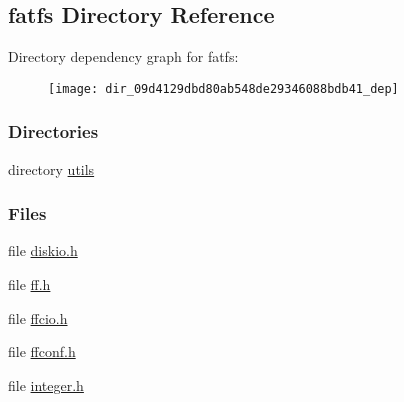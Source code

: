 \subsection{fatfs Directory Reference}
\label{dir_09d4129dbd80ab548de29346088bdb41}
Directory dependency graph for fatfs\+:
\nopagebreak
\begin{figure}[H]
\begin{center}
\leavevmode
\texttt{[image: dir\_09d4129dbd80ab548de29346088bdb41\_dep]}
\end{center}
\end{figure}
\subsubsection*{Directories}
\begin{DoxyCompactItemize}
\item 
directory \hyperlink{dir_c59c23ce3cff09378dc1c9d68a28cd84}{utils}
\end{DoxyCompactItemize}
\subsubsection*{Files}
\begin{DoxyCompactItemize}
\item 
file \hyperlink{diskio_8h}{diskio.\+h}
\item 
file \hyperlink{ff_8h}{ff.\+h}
\item 
file \hyperlink{ffcio_8h}{ffcio.\+h}
\item 
file \hyperlink{ffconf_8h}{ffconf.\+h}
\item 
file \hyperlink{integer_8h}{integer.\+h}
\end{DoxyCompactItemize}
